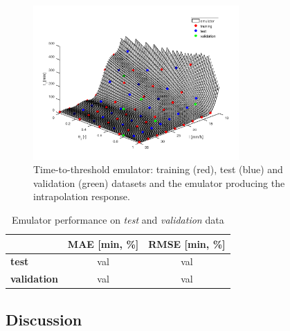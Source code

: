 \begin{figure}[h]
  \centering
  \includegraphics[width=0.7\textwidth]{Figures/emulator.png}
  \caption{Time-to-threshold emulator: training (red), test (blue) and validation (green) datasets and the emulator producing the intrapolation response.}
  \label{fig:emulator}
\end{figure}


\begin{table}[h]
  \centering
  \caption{Emulator performance on \emph{test} and \emph{validation} data}
  \label{table label}
  \begin{tabular}{lcc}
    \toprule
     & \textbf{MAE [\si{\minute}, \si{\percent}]} & \textbf{RMSE [\si{\minute}, \si{\percent}]} \\
    \midrule
    \textbf{test} & val & val \\
    \textbf{validation} & val & val \\
    \bottomrule
  \end{tabular}
\end{table}



\subsection{Discussion}



